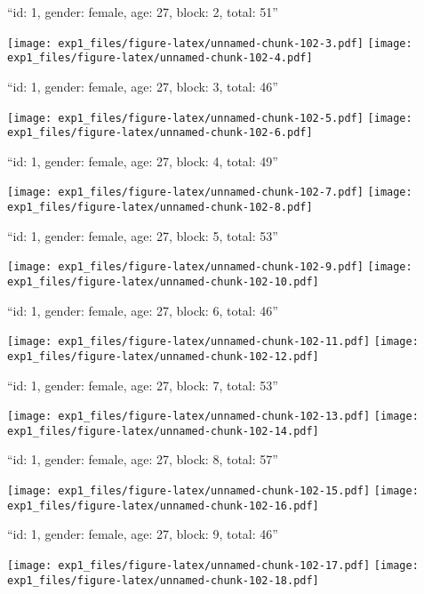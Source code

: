 \documentclass[11pt,,]{article}
\begin{document}
\newpage
[1] 

``id: 1, gender: female, age: 27, block: 2, total: 51''

\texttt{[image: exp1\_files/figure-latex/unnamed-chunk-102-3.pdf]}
\texttt{[image: exp1\_files/figure-latex/unnamed-chunk-102-4.pdf]}

\newpage
[1] 

``id: 1, gender: female, age: 27, block: 3, total: 46''

\texttt{[image: exp1\_files/figure-latex/unnamed-chunk-102-5.pdf]}
\texttt{[image: exp1\_files/figure-latex/unnamed-chunk-102-6.pdf]}

\newpage
[1] 

``id: 1, gender: female, age: 27, block: 4, total: 49''

\texttt{[image: exp1\_files/figure-latex/unnamed-chunk-102-7.pdf]}
\texttt{[image: exp1\_files/figure-latex/unnamed-chunk-102-8.pdf]}

\newpage
[1] 

``id: 1, gender: female, age: 27, block: 5, total: 53''

\texttt{[image: exp1\_files/figure-latex/unnamed-chunk-102-9.pdf]}
\texttt{[image: exp1\_files/figure-latex/unnamed-chunk-102-10.pdf]}

\newpage
[1] 

``id: 1, gender: female, age: 27, block: 6, total: 46''

\texttt{[image: exp1\_files/figure-latex/unnamed-chunk-102-11.pdf]}
\texttt{[image: exp1\_files/figure-latex/unnamed-chunk-102-12.pdf]}

\newpage
[1] 

``id: 1, gender: female, age: 27, block: 7, total: 53''

\texttt{[image: exp1\_files/figure-latex/unnamed-chunk-102-13.pdf]}
\texttt{[image: exp1\_files/figure-latex/unnamed-chunk-102-14.pdf]}

\newpage
[1] 

``id: 1, gender: female, age: 27, block: 8, total: 57''

\texttt{[image: exp1\_files/figure-latex/unnamed-chunk-102-15.pdf]}
\texttt{[image: exp1\_files/figure-latex/unnamed-chunk-102-16.pdf]}

\newpage
[1] 

``id: 1, gender: female, age: 27, block: 9, total: 46''

\texttt{[image: exp1\_files/figure-latex/unnamed-chunk-102-17.pdf]}
\texttt{[image: exp1\_files/figure-latex/unnamed-chunk-102-18.pdf]}
\end{document}
